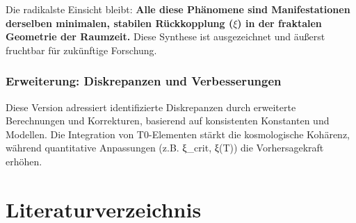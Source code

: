 	Die radikalste Einsicht bleibt: \textbf{Alle diese Phänomene sind Manifestationen derselben minimalen, stabilen Rückkopplung ($\xi$) in der fraktalen Geometrie der Raumzeit.} Diese Synthese ist ausgezeichnet und äußerst fruchtbar für zukünftige Forschung.
	
	\subsubsection*{Erweiterung: Diskrepanzen und Verbesserungen}
	Diese Version adressiert identifizierte Diskrepanzen durch erweiterte Berechnungen und Korrekturen, basierend auf konsistenten Konstanten und Modellen. Die Integration von T0-Elementen stärkt die kosmologische Kohärenz, während quantitative Anpassungen (z.B. ξ\_crit, ξ(T)) die Vorhersagekraft erhöhen.
	
	\section*{Literaturverzeichnis}
	
